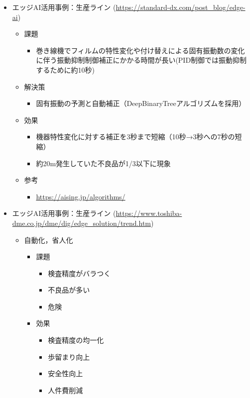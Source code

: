 \begin{itemize}
\begin{itemize}
\begin{itemize}
		\end{itemize}
	\end{itemize}
	\item エッジAI活用事例：生産ライン (\url{https://standard-dx.com/post_blog/edge-ai})
	\begin{itemize}
		\item 課題
		\begin{itemize}
			\item 巻き線機でフィルムの特性変化や付け替えによる固有振動数の変化に伴う振動抑制制御補正にかかる時間が長い(PID制御では振動抑制するために約10秒)
		\end{itemize}
		\item 解決策
		\begin{itemize}
			\item 固有振動の予測と自動補正（DeepBinaryTreeアルゴリズムを採用）
		\end{itemize}
		\item 効果
		\begin{itemize}
			\item 機器特性変化に対する補正を3秒まで短縮（10秒→3秒への7秒の短縮）
			\item 約20m発生していた不良品が1/3以下に現象
		\end{itemize}
		\item 参考
		\begin{itemize}
			\item \url{https://aising.jp/algorithms/}
		\end{itemize}
	\end{itemize}
	\item エッジAI活用事例：生産ライン (\url{https://www.toshiba-dme.co.jp/dme/dig/edge_solution/trend.htm})
	\begin{itemize}
		\item 自動化，省人化
		\begin{itemize}
			\item 課題
			\begin{itemize}
				\item 検査精度がバラつく
				\item 不良品が多い
				\item 危険
			\end{itemize}
			\item 効果
			\begin{itemize}
				\item 検査精度の均一化
				\item 歩留まり向上
				\item 安全性向上
				\item 人件費削減

\end{itemize}
\end{itemize}
\end{itemize}
\end{itemize}
